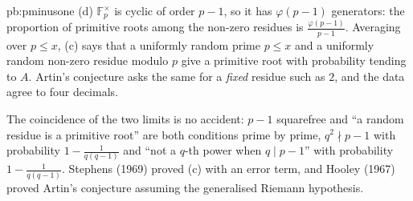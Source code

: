 \begin{solution}{pb:pminusone}
(d) $\mathbb F_p^\times$ is cyclic of order $p-1$, so it has $\varphi(p-1)$ generators: the proportion of primitive roots among the non-zero residues is $\frac{\varphi(p-1)}{p-1}$. Averaging over $p\le x$,
(c) says that a uniformly random prime $p\le x$ and a uniformly random non-zero residue modulo $p$ give a primitive root with probability tending to $A$. Artin's conjecture asks the same for a
\emph{fixed} residue such as $2$, and the data agree to four decimals.

\leads The coincidence of the two limits is no accident: $p-1$ squarefree and ``a random residue is a primitive root'' are both conditions prime by prime, $q^2\nmid p-1$ with probability $1-\frac1{q(q-1)}$
and ``not a $q$-th power when $q\mid p-1$'' with probability $1-\frac1{q(q-1)}$. Stephens (1969) proved (c) with an error term, and Hooley (1967) proved Artin's conjecture assuming the generalised
Riemann hypothesis.
\end{solution}


